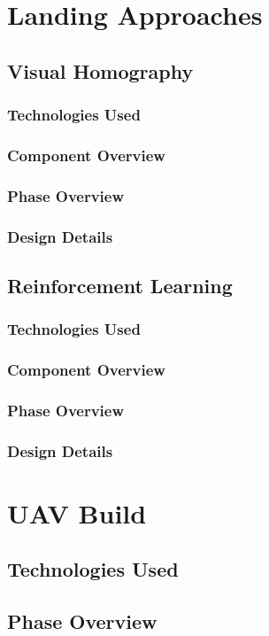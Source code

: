 \section{Landing Approaches}
\subsection{Visual Homography}
\subsubsection{Technologies  Used}
\subsubsection{Component  Overview}
\subsubsection{Phase Overview}
\subsubsection{Design Details}

\subsection{Reinforcement Learning}
\subsubsection{Technologies  Used}
\subsubsection{Component  Overview}
\subsubsection{Phase Overview}
\subsubsection{Design Details}

\section{UAV Build}
\subsection{Technologies  Used}
\subsection{Phase Overview}
